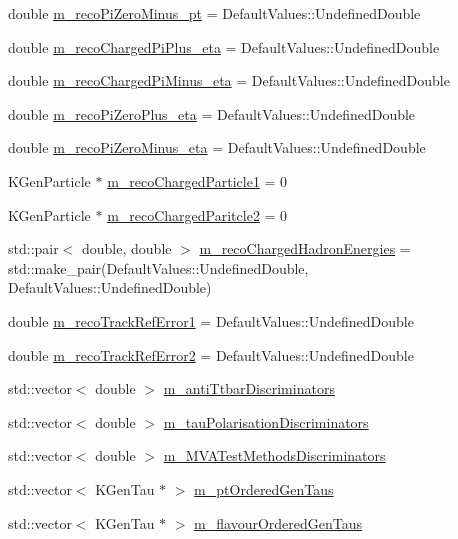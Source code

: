 \begin{DoxyCompactItemize}
\item 
double \hyperlink{classHttProduct_a7786e41a155cb50c5083eba8575cb262}{m\_\-recoPiZeroMinus\_\-pt} = DefaultValues::UndefinedDouble
\item 
double \hyperlink{classHttProduct_a904bf8957cc303f9c257259d898675e8}{m\_\-recoChargedPiPlus\_\-eta} = DefaultValues::UndefinedDouble
\item 
double \hyperlink{classHttProduct_a86d235473b682dc25e69a6fde2c91fa7}{m\_\-recoChargedPiMinus\_\-eta} = DefaultValues::UndefinedDouble
\item 
double \hyperlink{classHttProduct_a319d9cdf83b816f05085fbe62afe435c}{m\_\-recoPiZeroPlus\_\-eta} = DefaultValues::UndefinedDouble
\item 
double \hyperlink{classHttProduct_abdeb3313e8426bbf9d2a4d888104651a}{m\_\-recoPiZeroMinus\_\-eta} = DefaultValues::UndefinedDouble
\item 
KGenParticle $\ast$ \hyperlink{classHttProduct_ab6e20142aa603f129f8beb7935997aca}{m\_\-recoChargedParticle1} = 0
\item 
KGenParticle $\ast$ \hyperlink{classHttProduct_ade299bec9d6dd15b181cd562ec28cd3b}{m\_\-recoChargedParitcle2} = 0
\item 
std::pair$<$ double, double $>$ \hyperlink{classHttProduct_a00b53081f6bd3ad818e9108569389e43}{m\_\-recoChargedHadronEnergies} = std::make\_\-pair(DefaultValues::UndefinedDouble, DefaultValues::UndefinedDouble)
\item 
double \hyperlink{classHttProduct_a4bd6de3ec7586444d48d4d0d89d3deaf}{m\_\-recoTrackRefError1} = DefaultValues::UndefinedDouble
\item 
double \hyperlink{classHttProduct_a95d22008c2a25f1bd7403f12b1f1666e}{m\_\-recoTrackRefError2} = DefaultValues::UndefinedDouble
\item 
std::vector$<$ double $>$ \hyperlink{classHttProduct_acabaf148b0c74108cceed4250817b299}{m\_\-antiTtbarDiscriminators}
\item 
std::vector$<$ double $>$ \hyperlink{classHttProduct_aa0c3f0fdfab21ffb2f82fd856dc54410}{m\_\-tauPolarisationDiscriminators}
\item 
std::vector$<$ double $>$ \hyperlink{classHttProduct_a5edebff621a1c9c48bed3a53bd7d0749}{m\_\-MVATestMethodsDiscriminators}
\item 
std::vector$<$ KGenTau $\ast$ $>$ \hyperlink{classHttProduct_a4b39739074003e2a8c665d32005c4e2b}{m\_\-ptOrderedGenTaus}
\item 
std::vector$<$ KGenTau $\ast$ $>$ \hyperlink{classHttProduct_af3a22fec33a3dc27d44b9124c8d1efca}{m\_\-flavourOrderedGenTaus}

\end{DoxyCompactItemize}
